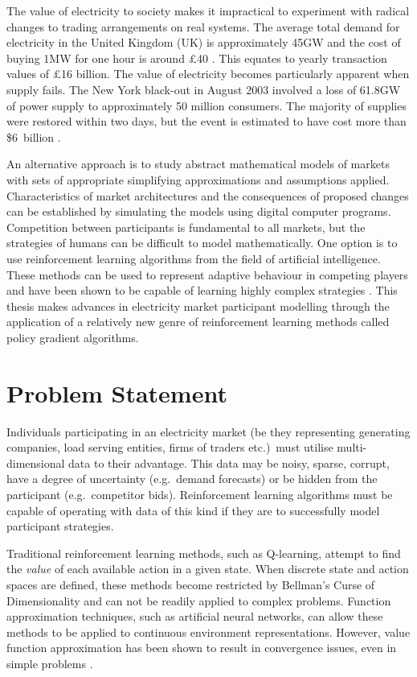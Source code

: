 The value of electricity to society makes it impractical to
experiment with radical changes to trading arrangements on real systems.
The average total demand for electricity in the United Kingdom (UK) is
approximately 45GW and the cost of buying 1MW for one hour is around
\pounds40 \cite{decc:dukes09}. This equates to yearly transaction values of
\pounds16 billion.  The value of electricity becomes particularly
apparent when supply fails. The New York black-out in August 2003 involved
a loss of 61.8GW of power supply to approximately 50 million consumers.
The majority of supplies were restored within two days, but the event is
estimated to have cost more than \$6~billion \cite{minkel:2008,icf:2003}.

An alternative approach is to study abstract mathematical models of markets with
sets of appropriate simplifying approximations and assumptions applied.
Characteristics of market architectures and the consequences of proposed changes
can be established by simulating the models using digital computer programs.
Competition between participants is fundamental to all markets, but
the strategies of humans can be difficult to model mathematically. One option is
to use reinforcement learning algorithms from the field of artificial
intelligence.  These methods can be used to represent adaptive behaviour in
competing players and have been shown to be capable
of learning highly complex strategies \cite{tesauro:gammon}.  This thesis makes
advances in electricity market participant modelling through the application of
a relatively new genre of reinforcement learning methods called policy gradient
algorithms.

\section{Problem Statement}%
Individuals participating in an electricity market (be they representing
generating companies, load serving entities, firms of traders etc.)~must utilise
multi-dimensional data to their advantage. This data may be noisy, sparse,
corrupt, have a degree of uncertainty (e.g.~demand forecasts) or be hidden from
the participant (e.g.~competitor bids).  Reinforcement learning algorithms must
be capable of operating with data of this kind if they are to successfully model
participant strategies.

Traditional reinforcement learning methods, such as Q-learning, attempt to find
the \textit{value} of each available action in a given state.  When discrete
state and action spaces are defined, these methods become restricted by
Bellman's Curse of Dimensionality \cite{bellman:1961} and can not be readily
applied to complex problems.  Function approximation techniques, such as
artificial neural networks, can allow these methods to be applied to continuous
environment representations. However, value function approximation has been
shown to result in convergence issues, even in simple problems
\cite{tsitsiklis:94,peters:enac,gordon:95,baird:95}.

